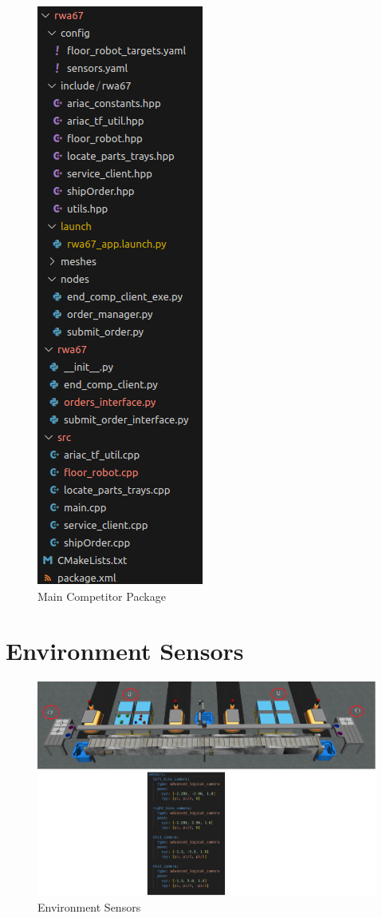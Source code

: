 \documentclass{uva-inf-article}
\begin{document}
\begin{figure}[h]
    \centering
    \includegraphics[scale=1]{images/main_competitor_package.png}
    \caption{Main Competitor Package}
    \label{fig:mnCompPkg}
\end{figure}

\clearpage
\justifying
\section{Environment Sensors}

\begin{figure}[h]
\centering
\includegraphics[scale=0.65]{images/environment_sensors.png}
\caption{Environment Sensors}
\label{fig:envSnsrs}
\end{figure}
\end{document}
